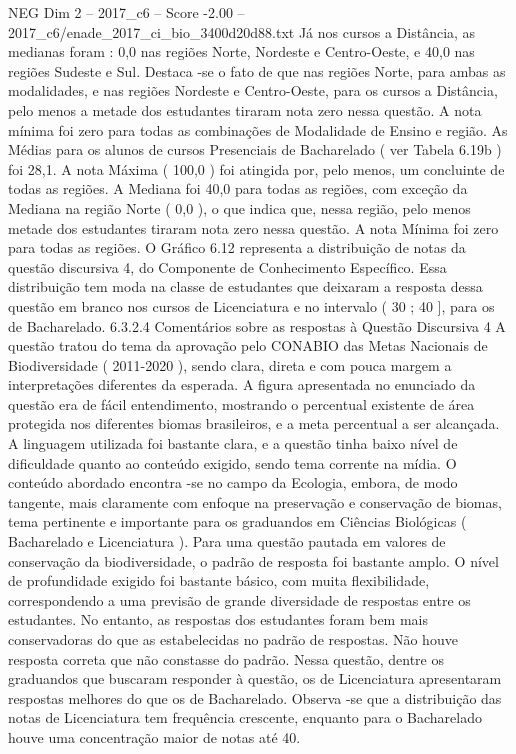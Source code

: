 \begin{textsample}{NEG Dim 2 – 2017\_c6 – Score -2.00 – 2017\_c6/enade\_2017\_ci\_bio\_3400d20d88.txt}
Já nos cursos a Distância, as medianas foram : 0,0 nas regiões Norte, Nordeste e Centro-Oeste, e 40,0 nas regiões Sudeste e Sul.
Destaca -se o fato de que nas regiões Norte, para ambas as modalidades, e nas regiões Nordeste e Centro-Oeste, para os cursos a Distância, pelo menos a metade dos estudantes tiraram nota zero nessa questão.
A nota mínima foi zero para todas as combinações de Modalidade de Ensino e região.
As Médias para os alunos de cursos Presenciais de Bacharelado ( ver Tabela 6.19b ) foi 28,1.
A nota Máxima ( 100,0 ) foi atingida por, pelo menos, um concluinte de todas as regiões.
A Mediana foi 40,0 para todas as regiões, com exceção da Mediana na região Norte ( 0,0 ), o que indica que, nessa região, pelo menos metade dos estudantes tiraram nota zero nessa questão.
A nota Mínima foi zero para todas as regiões.
O Gráfico 6.12 representa a distribuição de notas da questão discursiva 4, do Componente de Conhecimento Específico.
Essa distribuição tem moda na classe de estudantes que deixaram a resposta dessa questão em branco nos cursos de Licenciatura e no intervalo ( 30 ; 40 ], para os de Bacharelado. 6.3.2.4 Comentários sobre as respostas à Questão Discursiva 4 A questão tratou do tema da aprovação pelo CONABIO das Metas Nacionais de Biodiversidade ( 2011-2020 ), sendo clara, direta e com pouca margem a interpretações diferentes da esperada.
A figura apresentada no enunciado da questão era de fácil entendimento, mostrando o percentual existente de área protegida nos diferentes biomas brasileiros, e a meta percentual a ser alcançada.
A linguagem utilizada foi bastante clara, e a questão tinha baixo nível de dificuldade quanto ao conteúdo exigido, sendo tema corrente na mídia.
O conteúdo abordado encontra -se no campo da Ecologia, embora, de modo tangente, mais claramente com enfoque na preservação e conservação de biomas, tema pertinente e importante para os graduandos em Ciências Biológicas ( Bacharelado e Licenciatura ).
Para uma questão pautada em valores de conservação da biodiversidade, o padrão de resposta foi bastante amplo.
O nível de profundidade exigido foi bastante básico, com muita flexibilidade, correspondendo a uma previsão de grande diversidade de respostas entre os estudantes.
No entanto, as respostas dos estudantes foram bem mais conservadoras do que as estabelecidas no padrão de respostas.
Não houve resposta correta que não constasse do padrão.
Nessa questão, dentre os graduandos que buscaram responder à questão, os de Licenciatura apresentaram respostas melhores do que os de Bacharelado.
Observa -se que a distribuição das notas de Licenciatura tem frequência crescente, enquanto para o Bacharelado houve uma concentração maior de notas até 40.

\end{textsample}
